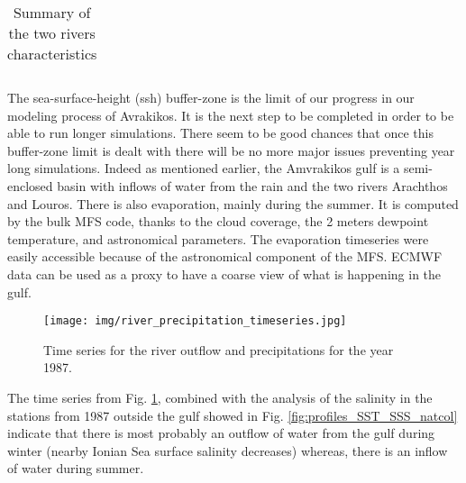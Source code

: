 \documentclass[english]{PFeENSTA}
\begin{document}
{\begin{table}[!h]
\begin{center}
\begin{tabular}{| l | c | l| }
    \hline
  \end{tabular}
\caption{Summary of the two rivers characteristics}
\label{Rivers_summary}
\end{center}
\end{table}



 The sea-surface-height (ssh) buffer-zone is the limit of our progress in our modeling process of Avrakikos. It is the next step to be completed in order to be able to run longer simulations. There seem to be good chances that once this buffer-zone limit is dealt with there will be no more major issues preventing year long simulations. Indeed as mentioned earlier, the Amvrakikos gulf is a semi-enclosed basin with inflows of water from the rain and the two rivers Arachthos and Louros. There is also evaporation, mainly during the summer. It is computed by the bulk MFS code, thanks to the cloud coverage, the 2 meters dewpoint temperature, and astronomical parameters. The evaporation timeseries were easily accessible because of the astronomical component of the MFS. ECMWF data can be used as a proxy to have a coarse view of what is happening in the gulf.
 
 \begin{figure}[H]
   \begin{minipage}[h!]{1\linewidth}
   \centering
   \texttt{[image: img/river\_precipitation\_timeseries.jpg]}
   \end{minipage}
  \caption{\label{fig:tp_river_TimeSeries}Time series for the river outflow and precipitations for the year 1987.}
\end{figure}

The time series from Fig. \ref{fig:tp_river_TimeSeries}, combined with the analysis of the salinity in the stations from 1987 outside the gulf showed in Fig.	 \ref{fig:profiles_SST_SSS_natcol} indicate that there is most probably an outflow of water from the gulf during winter (nearby Ionian Sea surface salinity decreases) whereas, there is an inflow of water during  summer.

}
\end{document}
